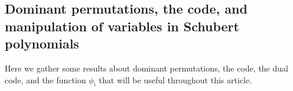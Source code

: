 \documentclass[reqno]{amsart}
\newtheorem{corollary}[lemma]{Corollary}
\newtheorem{proposition}[lemma]{Proposition}
\theoremstyle{definition}
\theoremstyle{remark}
\numberwithin{equation}{subsection}
\newcommand{\dom}{\mathfrak{d}}
\newcommand{\ldom}{\dom^*}
\newcommand{\code}{\mathfrak{c}}
\begin{document}
\subsection{Dominant permutations, the code, and manipulation of variables in Schubert polynomials}

Here we gather some results about dominant permutations, the code, the dual code, and the function $\phi_i$ that will be useful throughout this article.






%
%
\end{document}
